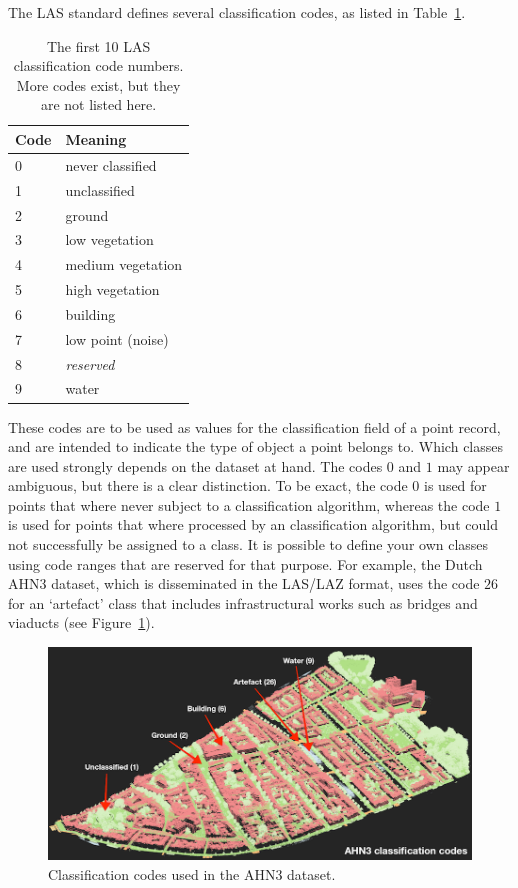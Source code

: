 The LAS standard defines several classification codes, as listed in Table~\ref{tab:las-classes}.
\begin{table}
  \centering
\begin{tabular}{l|l}
  Code & Meaning \\ \midrule
  0 & never classified \\
  1 & unclassified \\
  2 & ground \\
  3 & low vegetation \\
  4 & medium vegetation \\
  5 & high vegetation \\
  6 & building \\
  7 & low point (noise) \\
  8 & \emph{reserved} \\
  9 & water \\
\end{tabular}
\caption{The first 10 LAS classification code numbers. More codes exist, but they are not listed here.}
\label{tab:las-classes}
\end{table}
These codes are to be used as values for the classification field of a point record, and are intended to indicate the type of object a point belongs to.
Which classes are used strongly depends on the dataset at hand.
The codes $0$ and $1$ may appear ambiguous, but there is a clear distinction.
To be exact, the code $0$ is used for points that where never subject to a classification algorithm, whereas the code $1$ is used for points that where processed by an classification algorithm, but could not successfully be assigned to a class.
It is possible to define your own classes using code ranges that are reserved for that purpose.
For example, the Dutch AHN3 dataset, which is disseminated in the LAS/LAZ format, uses the code $26$ for an `artefact' class that includes infrastructural works such as bridges and viaducts (see Figure~\ref{fig:ahn3}).
\begin{figure}
  \includegraphics[width=\linewidth]{figs/ahn3.png}
  \caption{Classification codes used in the AHN3 dataset.}
  \label{fig:ahn3}
\end{figure}

